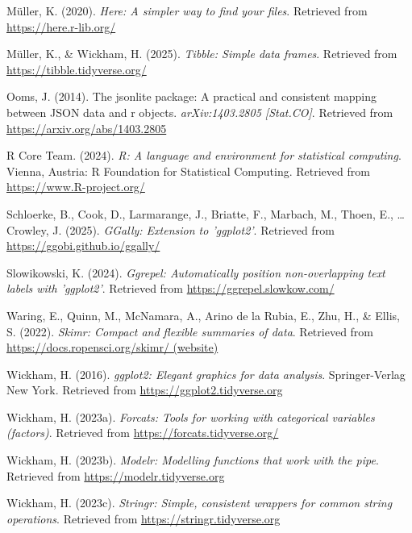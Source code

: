 \documentclass[
  english,
  man,floatsintext]{apa6}
\newlength{\cslhangindent}
\newenvironment{CSLReferences}[2] %
 {\begin{list}{}{%
  \setlength{\itemindent}{0pt}
  \setlength{\leftmargin}{0pt}
  \setlength{\parsep}{0pt}
  \ifodd #1
   \setlength{\leftmargin}{\cslhangindent}
   \setlength{\itemindent}{-1\cslhangindent}
  \fi
  \setlength{\itemsep}{#2\baselineskip}}}
 {\end{list}}
\begin{document}
\begin{CSLReferences}{1}{0}
Müller, K. (2020). \emph{Here: A simpler way to find your files}. Retrieved from \url{https://here.r-lib.org/}

Müller, K., \& Wickham, H. (2025). \emph{Tibble: Simple data frames}. Retrieved from \url{https://tibble.tidyverse.org/}

Ooms, J. (2014). The jsonlite package: A practical and consistent mapping between JSON data and r objects. \emph{arXiv:1403.2805 {[}Stat.CO{]}}. Retrieved from \url{https://arxiv.org/abs/1403.2805}

R Core Team. (2024). \emph{R: A language and environment for statistical computing}. Vienna, Austria: R Foundation for Statistical Computing. Retrieved from \url{https://www.R-project.org/}

Schloerke, B., Cook, D., Larmarange, J., Briatte, F., Marbach, M., Thoen, E., \ldots{} Crowley, J. (2025). \emph{GGally: Extension to 'ggplot2'}. Retrieved from \url{https://ggobi.github.io/ggally/}

Slowikowski, K. (2024). \emph{Ggrepel: Automatically position non-overlapping text labels with 'ggplot2'}. Retrieved from \url{https://ggrepel.slowkow.com/}

Waring, E., Quinn, M., McNamara, A., Arino de la Rubia, E., Zhu, H., \& Ellis, S. (2022). \emph{Skimr: Compact and flexible summaries of data}. Retrieved from \href{https://docs.ropensci.org/skimr/\%20(website)}{https://docs.ropensci.org/skimr/ (website)}

Wickham, H. (2016). \emph{ggplot2: Elegant graphics for data analysis}. Springer-Verlag New York. Retrieved from \url{https://ggplot2.tidyverse.org}

Wickham, H. (2023a). \emph{Forcats: Tools for working with categorical variables (factors)}. Retrieved from \url{https://forcats.tidyverse.org/}

Wickham, H. (2023b). \emph{Modelr: Modelling functions that work with the pipe}. Retrieved from \url{https://modelr.tidyverse.org}

Wickham, H. (2023c). \emph{Stringr: Simple, consistent wrappers for common string operations}. Retrieved from \url{https://stringr.tidyverse.org}


\end{CSLReferences}
\end{document}
